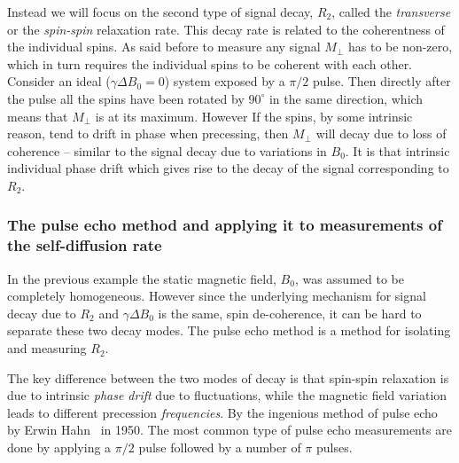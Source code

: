 \documentclass[11pt,a4paper, twocolumn,
swedish, english %
]{article}
\begin{document}
Instead we will focus on the second type of signal decay, $R_2$,
called the \emph{transverse} or the \emph{spin-spin} relaxation
rate. This decay rate is related to the coherentness of the individual
spins. As said before to measure any signal $M_\perp$ has to be
non-zero, which in turn requires the individual spins to be coherent
with each other. Consider an ideal ($\gamma\Delta B_0=0$) system
exposed by a $\pi/2$ pulse. Then directly after the pulse all the
spins have been rotated by $90^\circ$ in the same direction, which
means that $M_\perp$ is at its maximum. However If the spins, by some
intrinsic reason, tend to drift in phase when precessing, then
$M_\perp$ will decay due to loss of coherence -- similar to the signal
decay due to variations in $B_0$. It is that intrinsic individual
phase drift which gives rise to the decay of the signal corresponding
to $R_2$.  


\subsubsection{The pulse echo method and applying it to
measurements of the self-diffusion rate} 
\label{sec:pulse-echo}
In the previous example the static magnetic field, $B_0$, was assumed
to be completely homogeneous. However since the underlying mechanism
for signal decay due to $R_2$ and $\gamma\Delta B_0$ is the same, spin
de-coherence, it can be hard to separate these two decay modes. The
pulse echo method is a method for isolating  and measuring $R_2$. 

The key difference between the two modes of decay is that spin-spin
relaxation is due to intrinsic \emph{phase drift} due to fluctuations,
while the magnetic field variation leads to different precession
\emph{frequencies}. By the ingenious method of pulse echo by Erwin
Hahn~\cite{Hahn1950} in 1950. The most common type of pulse echo
measurements are done by applying a $\pi/2$ pulse followed by a number
of $\pi$ pulses.
\end{document}

